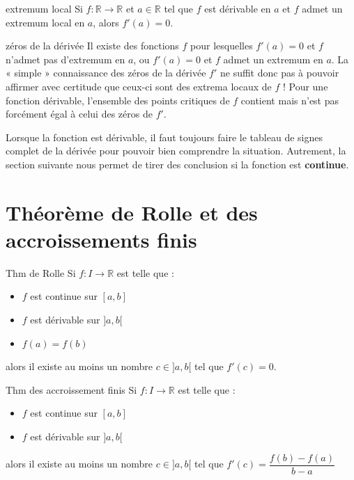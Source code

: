 \documentclass[a4paper,12pt]{article}
\begin{document}
\begin{thm}
	extremum local
	\tcblower
	Si $f:\mathbb{R}\rightarrow \mathbb{R}$ et $a\in \mathbb{R}$ tel que $f$ est dérivable en $a$ et $f$ admet un extremum local en $a$, alors $f'(a)=0$.
\end{thm}
\begin{remarque}
zéros de la dérivée
\tcblower
Il existe des fonctions $f$ pour lesquelles $f'(a) = 0$ et $f$ n'admet pas d'extremum en $a$, ou $f'(a) = 0$ et $f$ admet un extremum en $a$. La « simple » connaissance des zéros de la dérivée $f'$ ne suffit donc pas à pouvoir affirmer avec certitude que ceux-ci sont des extrema locaux de $f$ ! Pour une fonction dérivable, l'ensemble des points critiques de $f$ contient mais n'est pas forcément égal à celui des zéros de $f'$.

Lorsque la fonction est dérivable, il faut toujours faire le tableau de signes complet de la dérivée pour pouvoir bien comprendre la situation. Autrement, la section suivante nous permet de tirer des conclusion si la fonction est {\bfseries continue}.
\end{remarque}
\section{Théorème de Rolle et des accroissements finis}
\begin{thm}
Thm de Rolle
\tcblower
Si $f : I \to \mathbb{R}$ est telle que :
\begin{itemize}
\item $f$ est continue sur $[a,b]$
\item $f$ est dérivable sur $]a,b[$
\item $f(a) = f(b)$
\end{itemize}
alors il existe au moins un nombre $c \in ]a,b[$ tel que $f'(c) = 0$.
\end{thm}
\begin{thm}
Thm des accroissement finis
\tcblower
Si $f : I \to \mathbb{R}$ est telle que :
\begin{itemize}
\item $f$ est continue sur $[a,b]$
\item $f$ est dérivable sur $]a,b[$
\end{itemize}
alors il existe au moins un nombre $c \in ]a,b[$ tel que $f'(c) = \dfrac{f(b) - f(a)}{b - a}$
\end{thm}
\end{document}
